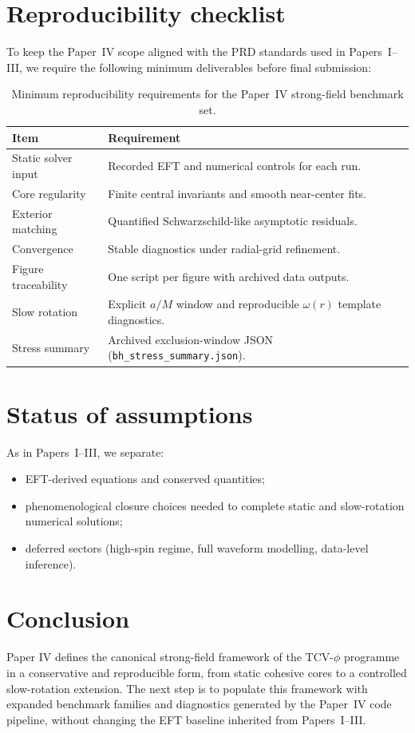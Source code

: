 \documentclass[aps,prd,onecolumn,nofootinbib,superscriptaddress]{revtex4-2}
\begin{document}
\section{Reproducibility checklist}
To keep the Paper~IV scope aligned with the PRD standards used in Papers~I--III, we require the following minimum deliverables before final submission:
\begin{table}[t]
  \centering
  \begin{tabular}{ll}
    \hline\hline
    Item & Requirement \\
    \hline
    Static solver input & Recorded EFT and numerical controls for each run. \\
    Core regularity & Finite central invariants and smooth near-center fits. \\
    Exterior matching & Quantified Schwarzschild-like asymptotic residuals. \\
    Convergence & Stable diagnostics under radial-grid refinement. \\
    Figure traceability & One script per figure with archived data outputs. \\
    Slow rotation & Explicit $a/M$ window and reproducible $\omega(r)$ template diagnostics. \\
    Stress summary & Archived exclusion-window JSON (\texttt{bh\_stress\_summary.json}). \\
    \hline\hline
  \end{tabular}
  \caption{Minimum reproducibility requirements for the Paper~IV strong-field benchmark set.}
  \label{tab:paper4-checklist}
\end{table}

\section{Status of assumptions}
As in Papers~I--III, we separate:
\begin{itemize}
  \item EFT-derived equations and conserved quantities;
  \item phenomenological closure choices needed to complete static and slow-rotation numerical solutions;
  \item deferred sectors (high-spin regime, full waveform modelling, data-level inference).
\end{itemize}

\section{Conclusion}
Paper IV defines the canonical strong-field framework of the TCV-$\phi$ programme in a conservative and reproducible form, from static cohesive cores to a controlled slow-rotation extension.
The next step is to populate this framework with expanded benchmark families and diagnostics generated by the Paper~IV code pipeline, without changing the EFT baseline inherited from Papers~I--III.
\end{document}
